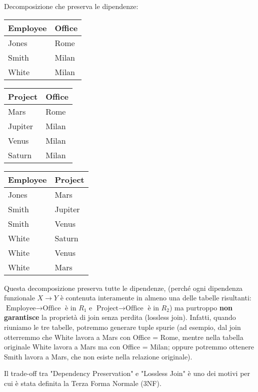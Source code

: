 \documentclass{article}
\begin{document}
	\noindent Decomposizione che preserva le dipendenze:
	\begin{center}
	\begin{tabular}{|l|l|}
		\hline
		\textbf{Employee} & \textbf{Office} \\ \hline
		Jones & Rome \\ \hline
		Smith & Milan \\ \hline
		White & Milan \\ \hline
	\end{tabular}
	\quad
	\begin{tabular}{|l|l|}
		\hline
		\textbf{Project} & \textbf{Office} \\ \hline
		Mars & Rome \\ \hline
		Jupiter & Milan \\ \hline
		Venus & Milan \\ \hline
		Saturn & Milan \\ \hline
	\end{tabular}
	\quad
	\begin{tabular}{|l|l|}
		\hline
		\textbf{Employee} & \textbf{Project} \\ \hline
		Jones & Mars \\ \hline
		Smith & Jupiter \\ \hline
		Smith & Venus \\ \hline
		White & Saturn \\ \hline
		White & Venus \\ \hline
		White & Mars \\ \hline
	\end{tabular}
	\end{center}
	
	\noindent Questa decomposizione preserva tutte le dipendenze, (perché ogni dipendenza funzionale $X \rightarrow Y$ è contenuta interamente in almeno una delle tabelle risultanti: $\text{Employee} \rightarrow \text{Office}$ è in $R_1$ e $\text{Project} \rightarrow \text{Office}$ è in $R_2$) ma purtroppo \textbf{non garantisce} la proprietà di join senza perdita (lossless join). Infatti, quando riuniamo le tre tabelle, potremmo generare tuple spurie (ad esempio, dal join otterremmo che White lavora a Mars con Office = Rome, mentre nella tabella originale White lavora a Mars ma con Office = Milan; oppure potremmo ottenere Smith lavora a Mars, che non esiste nella relazione originale).
	
	\noindent Il trade-off tra "Dependency Preservation" e "Lossless Join" è uno dei motivi per cui è stata definita la Terza Forma Normale (3NF).
	
\end{document}
